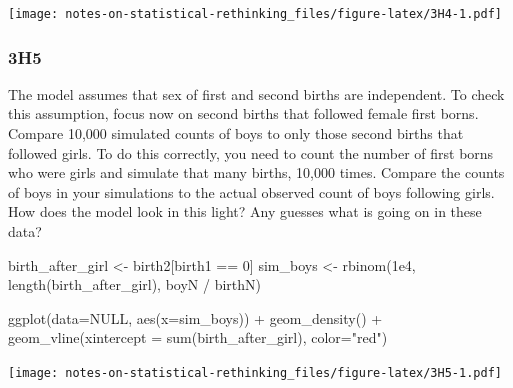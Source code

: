 \documentclass[
]{book}
\newenvironment{Shaded}{\begin{snugshade}}{\end{snugshade}}
\newcommand{\AttributeTok}[1]{\textcolor[rgb]{0.77,0.63,0.00}{#1}}
\newcommand{\ConstantTok}[1]{\textcolor[rgb]{0.00,0.00,0.00}{#1}}
\newcommand{\DecValTok}[1]{\textcolor[rgb]{0.00,0.00,0.81}{#1}}
\newcommand{\FloatTok}[1]{\textcolor[rgb]{0.00,0.00,0.81}{#1}}
\newcommand{\FunctionTok}[1]{\textcolor[rgb]{0.00,0.00,0.00}{#1}}
\newcommand{\NormalTok}[1]{#1}
\newcommand{\OtherTok}[1]{\textcolor[rgb]{0.56,0.35,0.01}{#1}}
\newcommand{\SpecialCharTok}[1]{\textcolor[rgb]{0.00,0.00,0.00}{#1}}
\newcommand{\StringTok}[1]{\textcolor[rgb]{0.31,0.60,0.02}{#1}}
\begin{document}
\texttt{[image: notes-on-statistical-rethinking\_files/figure-latex/3H4-1.pdf]}

\hypertarget{h5}{%
\subsubsection*{3H5}\label{h5}}

The model assumes that sex of first and second births are independent. To check this assumption, focus now on second births that followed female first borns. Compare 10,000 simulated counts of boys to only those second births that followed girls. To do this correctly, you need to count the number of first borns who were girls and simulate that many births, 10,000 times. Compare the counts of boys in your simulations to the actual observed count of boys following girls. How does the model look in this light? Any guesses what is going on in these data?

\begin{Shaded}
\begin{Highlighting}[]
\NormalTok{birth\_after\_girl }\OtherTok{\textless{}{-}}\NormalTok{ birth2[birth1 }\SpecialCharTok{==} \DecValTok{0}\NormalTok{]}
\NormalTok{sim\_boys }\OtherTok{\textless{}{-}} \FunctionTok{rbinom}\NormalTok{(}\FloatTok{1e4}\NormalTok{, }\FunctionTok{length}\NormalTok{(birth\_after\_girl), boyN }\SpecialCharTok{/}\NormalTok{ birthN)}

\FunctionTok{ggplot}\NormalTok{(}\AttributeTok{data=}\ConstantTok{NULL}\NormalTok{, }\FunctionTok{aes}\NormalTok{(}\AttributeTok{x=}\NormalTok{sim\_boys)) }\SpecialCharTok{+} 
  \FunctionTok{geom\_density}\NormalTok{() }\SpecialCharTok{+} 
  \FunctionTok{geom\_vline}\NormalTok{(}\AttributeTok{xintercept =} \FunctionTok{sum}\NormalTok{(birth\_after\_girl), }\AttributeTok{color=}\StringTok{"red"}\NormalTok{)}
\end{Highlighting}
\end{Shaded}

\texttt{[image: notes-on-statistical-rethinking\_files/figure-latex/3H5-1.pdf]}

  
\end{document}
